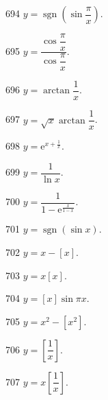 \begin{prob}[S]{694}
$y = \operatorname{sgn}\left(\sin \dfrac{\pi}{x}\right)$.
\end{prob}

\begin{prob}[S]{695}
$y = \dfrac{\cos \dfrac{\pi}{x}}{\cos \dfrac{\pi}{x}}$.
\end{prob}

\begin{prob}[S]{696}
$y = \arctan \dfrac{1}{x}$.
\end{prob}

\begin{prob}[S]{697}
$y = \sqrt{x} \arctan \dfrac{1}{x}$.
\end{prob}

\begin{prob}[S]{698}
$y = \mathrm{e}^{x + \frac{1}{x}}$.
\end{prob}

\begin{prob}[S]{699}
$y = \dfrac{1}{\ln x}$.
\end{prob}

\begin{prob}[S]{700}
$y = \dfrac{1}{1 - \mathrm{e}^{\frac{x}{1 - x}}}$.
\end{prob}


\begin{prob}[S]{701}
$y = \operatorname{sgn}(\sin x)$.
\end{prob}

\begin{prob}[S]{702}
$y = x - [x]$.
\end{prob}

\begin{prob}[S]{703}
$y = x[x]$.
\end{prob}

\begin{prob}[S]{704}
$y = [x] \sin \pi x$.
\end{prob}

\begin{prob}[S]{705}
$y = x^2 - [x^2]$.
\end{prob}

\begin{prob}[S]{706}
$y = \left[\dfrac{1}{x}\right]$.
\end{prob}

\begin{prob}[S]{707}
$y = x\left[\dfrac{1}{x}\right]$.
\end{prob}

